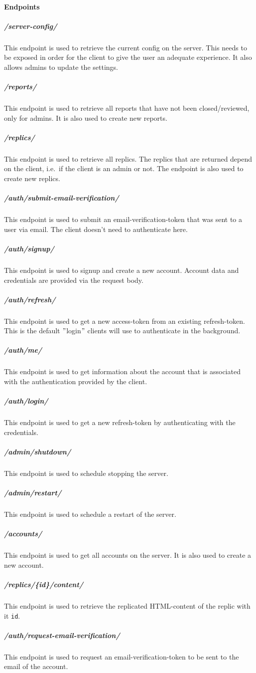 \paragraph{Endpoints}

\subparagraph{/server-config/} This endpoint is used to retrieve the current config on the server.
This needs to be exposed in order for the client to give the user an adequate experience.
It also allows admins to update the settings.

\subparagraph{/reports/} This endpoint is used to retrieve all reports that have not been closed/reviewed, only for admins.
It is also used to create new reports.

\subparagraph{/replics/} This endpoint is used to retrieve all replics.
The replics that are returned depend on the client, i.e.\ if the client is an admin or not.
The endpoint is also used to create new replics.

\subparagraph{/auth/submit-email-verification/} This endpoint is used to submit an email-verification-token that was sent to a user via email.
The client doesn't need to authenticate here.

\subparagraph{/auth/signup/} This endpoint is used to signup and create a new account.
Account data and credentials are provided via the request body.

\subparagraph{/auth/refresh/} This endpoint is used to get a new access-token from an existing refresh-token.
This is the default \("\)login\("\) clients will use to authenticate in the background.

\subparagraph{/auth/me/} This endpoint is used to get information about the account that is associated with the authentication provided by the client.

\subparagraph{/auth/login/} This endpoint is used to get a new refresh-token by authenticating with the credentials.

\subparagraph{/admin/shutdown/} This endpoint is used to schedule stopping the server.

\subparagraph{/admin/restart/} This endpoint is used to schedule a restart of the server.

\subparagraph{/accounts/} This endpoint is used to get all accounts on the server.
It is also used to create a new account.

\subparagraph{/replics/\{id\}/content/} This endpoint is used to retrieve the replicated HTML-content of the replic with it \texttt{id}.

\subparagraph{/auth/request-email-verification/} This endpoint is used to request an email-verification-token to be sent to the email of the account.

